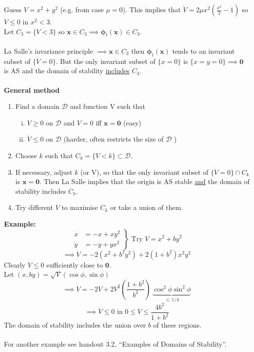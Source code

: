 \documentclass{article}
\newcommand{\domain}{\mathcal{D}}                           %
\newcommand{\example}{\textbf{Example:}}                    %
\newcommand{\bp}{\bm{\phi}}                                 %
\newcommand{\bx}{\bm{x}}                                    %
\begin{document}
Guess $V = x^2 + y^2$ (e.g. from case $\mu = 0$). This implies that
$\dot{V} = 2 \mu x^2 ( \frac{x^2}{3} -1)$ so $\dot{V} \leq 0$ in $x^2 <3$.
\\
Let $C_3 = \{ V < 3 \}$ so $\bx \in C_3 \implies \bp_t(\bx) \in C_3$.
\\
\\
La Salle's invariance principle $\implies \bx \in C_3$ then $\bp_t(\bx)$ tends
to an invariant subset of $\{ \dot{V}=0 \}$. But the only invariant subset of
$\{ x = 0 \}$ is $\{ x = y =0\} \implies \bm{0}$ is AS and the domain of
stability \underline{includes} $C_3$. 
\\
\\
\textbf{General method}
\begin{enumerate}[(1)]
\item Find a domain $\domain$ and function V such that
	\begin{enumerate}[(i)]
	\item $V \geq 0$ on $\domain$ and $V=0$ iff $\bx = \bm{0}$
		(easy)
	\item $\dot{V} \leq 0$ on $\domain$ (harder, often restricts the 
		size of $\domain$ )
	\end{enumerate}
\item Choose $k$ such that $C_k = \{V<k\} \subset \domain$.
\item If necessary, adjust $k$ (or V), so that the only invariant subset of
      $\{ \dot{V} = 0 \} \cap C_k$ is $\bx = \bm{0}$. Then La Salle implies
      that the origin is AS stable \underline{and} the domain of stability
      includes $C_k$.
\item Try different $V$ to maximise $C_k$ or take a union of them.
\end{enumerate}
\example\
\[ \left. \begin{array}{cl} \dot{x}  &= -x +xy^2 \\
			    \dot{y}  &= -y +yx^2 \end{array}
\right\} \mbox{ Try } V = x^2 +by^2 \]
\[ \implies \dot{V} = -2(x^2+b^2y^2) + 2(1+b^2)x^2y^2\]
Clearly $\dot{V} \leq 0$ sufficiently close to $\bm{0}$.
\\
Let $(x,by) = \sqrt{V}(\cos \phi, \sin \phi )$
\\
\[ \implies \dot{V} = -2V + 2V^2 \left( \frac{1+b^2}{b^2} \right) \
\underbrace{\cos ^2 \phi \sin ^2 \phi}_{\leq \, 1/4} \]
\[ \implies \dot{V} \leq 0 \mbox{ in } 0 \leq V \leq \frac{4b^2}{1+b^2} \]
The domain of stability includes the union over $b$ of these regions.
\\
\\
For another example see handout 3.2, ``Examples of Domains of Stability''.
\end{document}
